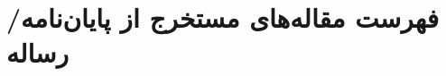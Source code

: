 \documentclass[phd,draftmode]{AlzahraThesis}
\begin{document}
\begin{spacing}{1.5}

\tableofcontents

\listoftables
\newpage
\listoffigures
\newpage
\end{spacing}

\pagestyle{fancy}


%
%
%

%




\pagestyle{empty}

\appendixMode








\newpage
\section*{فهرست مقاله‌های مستخرج از پایان‌نامه/رساله}
\end{document}
